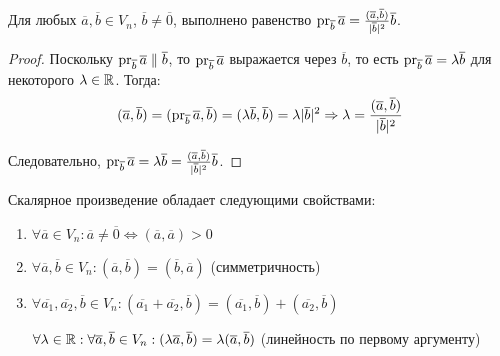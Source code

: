 \begin{proposition}
	Для любых $\overline{a}, \overline{b} \in V_n$, $\overline{b} \ne \overline{0}$, выполнено равенство $\operatorname{pr}_{\overline{b}}\overline{a} = \frac{(\overline{a}, \overline{b})}{|\overline{b}|^2}\overline{b}$.
\end{proposition}

\begin{proof}
	Поскольку $\operatorname{pr}_{\overline{b}}\overline{a} \parallel \overline{b}$, то $\operatorname{pr}_{\overline{b}}\overline{a}$ выражается через $\overline b$, то есть $\operatorname{pr}_{\overline{b}}\overline{a} = \lambda\overline{b}$ для некоторого $\lambda \in \mathbb{R}$. Тогда:
	\[
	(\overline{a}, \overline{b}) = (\operatorname{pr}_{\overline{b}}\overline{a}, \overline{b}) = (\lambda\overline{b}, \overline{b}) = \lambda |\overline{b}|^2 \Rightarrow \lambda = \frac{(\overline{a}, \overline{b})}{|\overline{b}|^2}\]
	
	Следовательно, $\operatorname{pr}_{\overline{b}}\overline{a} = \lambda\overline{b} = \frac{(\overline{a}, \overline{b})}{|\overline{b}|^2}\overline{b}$.
\end{proof}

\begin{theorem}
	Скалярное произведение обладает следующими свойствами:
	\begin{enumerate}
		\item $\forall \overline{a} \in V_n: \overline{a} \ne \overline{0} \Leftrightarrow (\overline{a}, \overline{a}) > 0$
		\item $\forall \overline{a}, \overline{b} \in V_n: (\overline{a}, \overline{b}) = (\overline{b}, \overline{a})$ (симметричность)
		\item $\forall \overline{a_1}, \overline{a_2}, \overline{b} \in V_n: (\overline{a_1} + \overline{a_2}, \overline{b}) = (\overline{a_1}, \overline{b}) + (\overline{a_2}, \overline{b})$
		
		$\forall \lambda \in \mathbb{R}: \forall \overline{a}, \overline{b} \in V_n: (\lambda\overline{a}, \overline{b}) = \lambda(\overline{a}, \overline{b})$ (линейность по первому аргументу)
	\end{enumerate}
\end{theorem}

